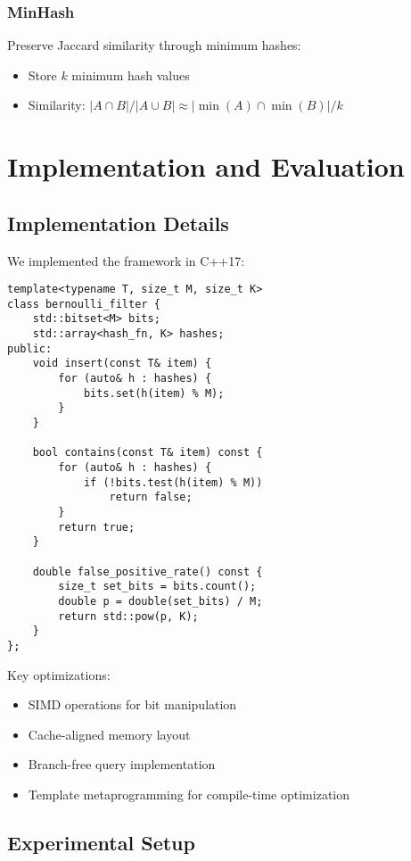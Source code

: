 \documentclass[11pt]{article}
\begin{document}
\subsubsection{MinHash}
Preserve Jaccard similarity through minimum hashes:
\begin{itemize}
\item Store $k$ minimum hash values
\item Similarity: $|A \cap B|/|A \cup B| \approx |\min(A) \cap \min(B)|/k$
\end{itemize}

\section{Implementation and Evaluation}

\subsection{Implementation Details}

We implemented the framework in C++17:

\begin{verbatim}
template<typename T, size_t M, size_t K>
class bernoulli_filter {
    std::bitset<M> bits;
    std::array<hash_fn, K> hashes;
public:
    void insert(const T& item) {
        for (auto& h : hashes) {
            bits.set(h(item) % M);
        }
    }

    bool contains(const T& item) const {
        for (auto& h : hashes) {
            if (!bits.test(h(item) % M))
                return false;
        }
        return true;
    }

    double false_positive_rate() const {
        size_t set_bits = bits.count();
        double p = double(set_bits) / M;
        return std::pow(p, K);
    }
};
\end{verbatim}

Key optimizations:
\begin{itemize}
\item SIMD operations for bit manipulation
\item Cache-aligned memory layout
\item Branch-free query implementation
\item Template metaprogramming for compile-time optimization
\end{itemize}

\subsection{Experimental Setup}
\end{document}
